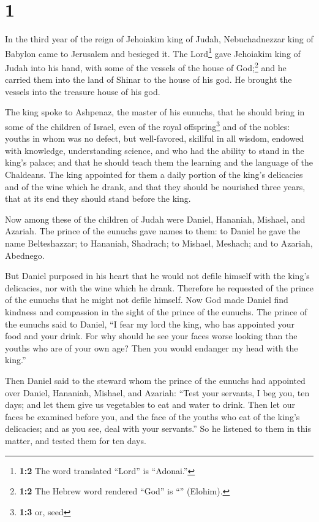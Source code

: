 \hypertarget{section}{%
\section{1}\label{section}}

 In the third year of the reign of Jehoiakim king of
Judah, Nebuchadnezzar king of Babylon came to Jerusalem and besieged it.
 The Lord\footnote{\textbf{1:2} The word translated
  ``Lord'' is ``Adonai.''} gave Jehoiakim king of Judah into his hand,
with some of the vessels of the house of God;\footnote{\textbf{1:2} The
  Hebrew word rendered ``God'' is ``'' (Elohim).} and he
carried them into the land of Shinar to the house of his god. He brought
the vessels into the treasure house of his god.

 The king spoke to Ashpenaz, the master of his eunuchs,
that he should bring in some of the children of Israel, even of the
royal offspring\footnote{\textbf{1:3} or, seed} and of the nobles:
 youths in whom was no defect, but well-favored, skillful
in all wisdom, endowed with knowledge, understanding science, and who
had the ability to stand in the king's palace; and that he should teach
them the learning and the language of the Chaldeans.  The
king appointed for them a daily portion of the king's delicacies and of
the wine which he drank, and that they should be nourished three years,
that at its end they should stand before the king.

 Now among these of the children of Judah were Daniel,
Hananiah, Mishael, and Azariah.  The prince of the eunuchs
gave names to them: to Daniel he gave the name Belteshazzar; to
Hananiah, Shadrach; to Mishael, Meshach; and to Azariah, Abednego.

 But Daniel purposed in his heart that he would not defile
himself with the king's delicacies, nor with the wine which he drank.
Therefore he requested of the prince of the eunuchs that he might not
defile himself.  Now God made Daniel find kindness and
compassion in the sight of the prince of the eunuchs. 
The prince of the eunuchs said to Daniel, ``I fear my lord the king, who
has appointed your food and your drink. For why should he see your faces
worse looking than the youths who are of your own age? Then you would
endanger my head with the king.''

 Then Daniel said to the steward whom the prince of the
eunuchs had appointed over Daniel, Hananiah, Mishael, and Azariah:
 ``Test your servants, I beg you, ten days; and let them
give us vegetables to eat and water to drink.  Then let
our faces be examined before you, and the face of the youths who eat of
the king's delicacies; and as you see, deal with your servants.''
 So he listened to them in this matter, and tested them
for ten days.

